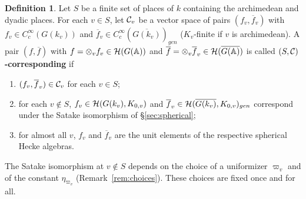 \documentclass[12pt,letterpaper,openany]{book}
\theoremstyle{plain}
\theoremstyle{definition}
\newtheorem{definition}[theorem]{Definition}
\theoremstyle{remark}
\theoremstyle{remark}
\begin{document}
\begin{definition}\label{def:corresponding}
Let $S$ be a finite set of places of $k$ containing the archimedean and
dyadic places. For each $v\in S$, let ${\cal C}_v$ be a vector space of
pairs $(f_v,\overline{f}_v)$ with $f_v\in C_c^\infty(G(k_v))$ and
$\overline{f}_v\in C_c^\infty(\overline{G(k_v)})_{gen}$ ($K_v$-finite if
$v$ is archimedean). A pair $(f,\overline{f})$ with
$f=\otimes_v f_v\in{\cal H}(G({\mathbb{A}}))$ and
$\overline{f}=\otimes_v\overline{f}_v\in{\cal H}(\overline{G({\mathbb{A}})})$
is called {\bf $(S,{\cal C})$-corresponding} if
\begin{enumerate}
\item $(f_v,\overline{f}_v)\in{\cal C}_v$ for each $v\in S$;
\item for each $v\notin S$, $f_v\in{\cal H}(G(k_v),K_{0,v})$ and
$\overline{f}_v\in{\cal H}(\overline{G(k_v)},K_{0,v})_{gen}$ correspond
under the Satake isomorphism of \S\ref{sec:spherical};
\item for almost all $v$, $f_v$ and $\overline{f}_v$ are the unit
elements of the respective spherical Hecke algebras.
\end{enumerate}
The Satake isomorphism at $v\notin S$ depends on the choice of a
uniformizer $\varpi_v$ and of the constant $\eta_{\varpi_v}$
(Remark~\ref{rem:choices}). These choices are fixed once and for all.
\end{definition}
\end{document}
